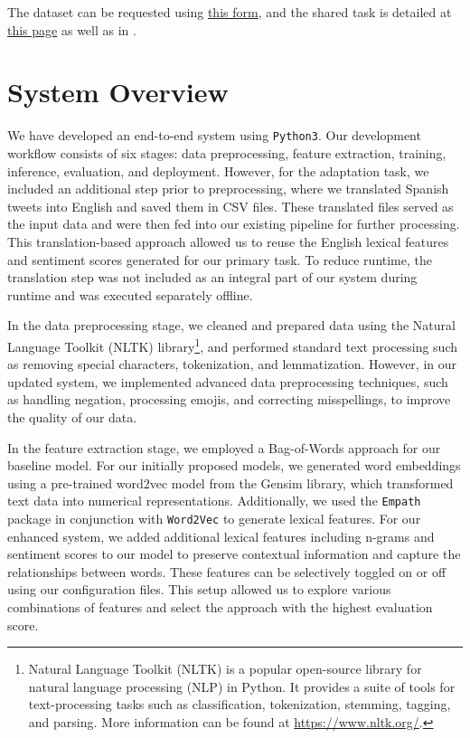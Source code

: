 \documentclass[11pt,a4paper]{article}
\begin{document}
   The dataset can be requested using \href{http://hatespeech.di.unito.it/hateval.html}{this form}, and the shared task is detailed at \href{https://competitions.codalab.org/competitions/19935#learn_the_details-overview}{this page} as well as in \citet{basile-etal-2019-semeval}.




\section{System Overview}
We have developed an end-to-end system using \verb|Python3|. Our development workflow consists of six stages: data preprocessing, feature extraction, training, inference, evaluation, and deployment. However, for the adaptation task, we included an additional step prior to preprocessing, where we translated Spanish tweets into English and saved them in CSV files. These translated files served as the input data and were then fed into our existing pipeline for further processing. This translation-based approach allowed us to reuse the English lexical features and sentiment scores generated for our primary task. To reduce runtime, the translation step was not included as an integral part of our system during runtime and was executed separately offline. 

    In the data preprocessing stage, we cleaned and prepared data using the Natural Language Toolkit (NLTK) library\footnote{Natural Language Toolkit (NLTK) is a popular open-source library for natural language processing (NLP) in Python. It provides a suite of tools for text-processing tasks such as classification, tokenization, stemming, tagging, and parsing. More information can be found at \url{https://www.nltk.org/}.}, and performed standard text processing such as removing special characters, tokenization, and lemmatization. However, in our updated system, we implemented advanced data preprocessing techniques, such as handling negation, processing emojis, and correcting misspellings, to improve the quality of our data.
    
  In the feature extraction stage, we employed a Bag-of-Words approach for our baseline model. For our initially proposed models, we generated word embeddings using a pre-trained word2vec model from the Gensim library, which transformed text data into numerical representations. Additionally, we used the \verb|Empath| package in conjunction with \verb|Word2Vec| to generate lexical features. For our enhanced system, we added additional lexical features including n-grams and sentiment scores to our model to preserve contextual information and capture the relationships between words. These features can be selectively toggled on or off using our configuration files. This setup allowed us to explore various combinations of features and select the approach with the highest evaluation score.
  
\end{document}
